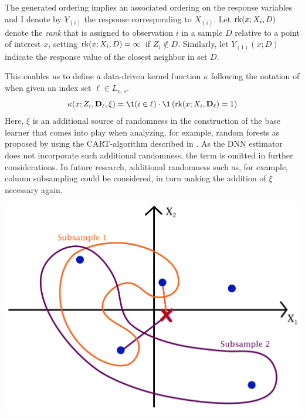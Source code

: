 The generated ordering implies an associated ordering on the response variables and I denote by $Y_{(i)}$ the response corresponding to $X_{(i)}$.
Let $\text{rk}(x; X_{i}, D)$ denote the \textit{rank} that is assigned to observation $i$ in a sample $D$ relative to a point of interest $x$, setting $\text{rk}(x; X_{i}, D) = \infty$ if $Z_{i} \not\in D$.
Similarly, let $Y_{(1)}(x; D)$ indicate the response value of the closest neighbor in set $D$.
\begin{minipage}{.5\textwidth}
    This enables us to define a data-driven kernel function $\kappa$ following the notation of \citet{ritzwoller_simultaneous_2024} when given an index set $\ell \in L_{n,s}$.
    \begin{equation}
        \kappa(x; Z_{i}, \mathbf{D}_{\ell}, \xi)
        = \1(i \in \ell) \cdot \1\left(\rk(x; X_{i}, \mathbf{D}_{\ell}) = 1\right)
    \end{equation}
    Here, $\xi$ is an additional source of randomness in the construction of the base learner that comes into play when analyzing, for example, random forests as proposed by \citet{breiman_random_2001} using the CART-algorithm described in \citet{breiman_classification_2017}.
    As the DNN estimator does not incorporate such additional randomness, the term is omitted in further considerations.
    In future research, additional randomness such as, for example, column subsampling could be considered, in turn making the addition of $\xi$ necessary again.
\end{minipage}%
\begin{minipage}{0.5\textwidth}
    \centering
    \includegraphics[width=0.8\linewidth]{Graphics/DNN_Estimator_Vis.png}
\end{minipage}

